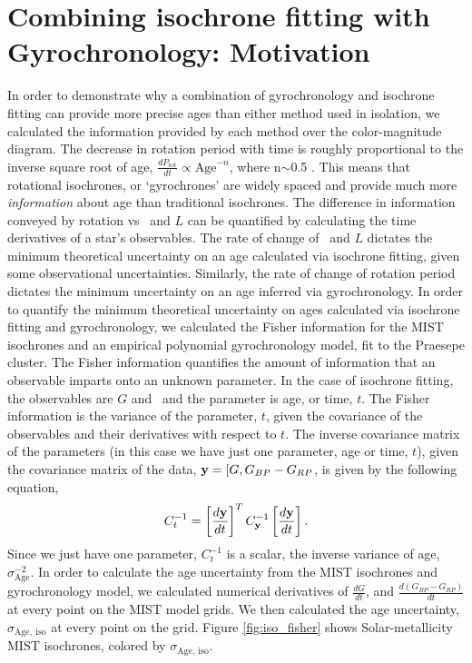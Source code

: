 \section{Combining isochrone fitting with Gyrochronology: Motivation}

In order to demonstrate why a combination of gyrochronology and isochrone
fitting can provide more precise ages than either method used in isolation, we
calculated the information provided by each method over the color-magnitude
diagram.
The decrease in rotation period with time is roughly proportional to the
inverse square root of age, $\frac{dP_{\mathrm{rot}}}{dt} \propto
\mathrm{Age}^{-n}$, where n$\sim$0.5 \citep{skumanich1972}.
This means that rotational isochrones, or `gyrochrones' are widely spaced and
provide much more {\it information} about age than traditional isochrones.
The difference in information conveyed by rotation vs \teff\ and $L$ can be
quantified by calculating the time derivatives of a star's observables.
The rate of change of \teff\ and $L$ dictates the minimum theoretical
uncertainty on an age calculated via isochrone fitting, given some
observational uncertainties.
Similarly, the rate of change of rotation period dictates the minimum
uncertainty on an age inferred via gyrochronology.
In order to quantify the minimum theoretical uncertainty on ages calculated
via isochrone fitting and gyrochronology, we calculated the Fisher information
for the MIST isochrones \citep{paxton2011, paxton2013, paxton2015, dotter2016,
choi2016, paxton2018} and an empirical polynomial gyrochronology model, fit to
the Praesepe cluster.
The Fisher information quantifies the amount of information that an observable
imparts onto an unknown parameter.
In the case of isochrone fitting, the observables are $G$ and \gcolor\ and the
parameter is age, or time, $t$.
The Fisher information is the variance of the parameter, $t$, given the
covariance of the observables and their derivatives with respect to $t$.
The inverse covariance matrix of the parameters (in this case we have just one
parameter, age or time, $t$), given the covariance matrix of the data, ${\bf y}
= [G, G_{BP} - G_{RP}$, is given by the following equation,
\begin{equation}
    C_{t}^{-1} = \left[\frac{d{\bf y}}{dt}\right]^T
    C_{\bf y}^{-1} \left[\frac{d{\bf y}}{dt}\right].
\end{equation}
Since we just have one parameter, $C_t^{-1}$ is a scalar, the inverse variance
of age, $\sigma_{\mathrm{Age}}^{-2}$.
In order to calculate the age uncertainty from the MIST isochrones and
gyrochronology model, we calculated numerical derivatives of $\frac{dG}{dt}$,
and $\frac{d(G_{BP} - G_{RP})}{dt}$ at every point on the MIST model grids.
We then calculated the age uncertainty, $\sigma_{\mathrm{Age,~iso}}$ at every
point on the grid.
Figure \ref{fig:iso_fisher} shows Solar-metallicity MIST isochrones, colored
by $\sigma_{\mathrm{Age,~iso}}$.

